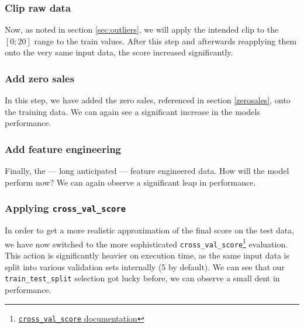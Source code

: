\subsubsection{Clip raw data }

Now, as noted in section \ref{sec:outliers}, we will apply the intended clip to the $[0;20]$ range to the train values. After this step and afterwards reapplying them onto the very same input data, the score increased significantly.

\subsubsection{Add zero sales }

In this step, we have added the zero sales, referenced in section \ref{zerosales}, onto the training data. We can again see a significant increase in the models performance.


\subsubsection{Add feature engineering }

Finally, the --- long anticipated --- feature engineered data. How will the model perform now? We can again observe a significant leap in performance.

\subsubsection{Applying \texttt{cross\_val\_score} }

In order to get a more realistic approximation of the final score on the test data, we have now switched to the more sophisticated \texttt{cross\_val\_score}\footnote{\href{https://scikit-learn.org/stable/modules/generated/sklearn.model_selection.cross_val_score.html}{\texttt{cross\_val\_score} documentation}} evaluation. This action is significantly heavier on execution time, as the same input data is split into various validation sets internally (5 by default).
We can see that our \texttt{train\_test\_split} selection got lucky before, we can observe a small dent in performance.


